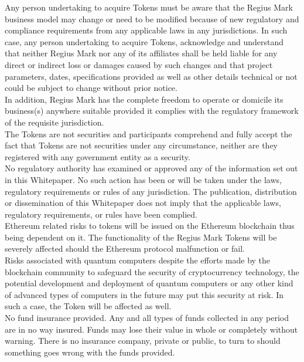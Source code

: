 \documentclass[12pt,a4paper]{article}
\begin{document}
  Any person undertaking to acquire Tokens must be aware that the Regius Mark
  business model may change or need to be modified because of new regulatory and
  compliance requirements from any applicable laws in any jurisdictions. In such
  case, any person undertaking to acquire Tokens, acknowledge and understand
  that neither Regius Mark nor any of its affiliates shall be held liable for
  any direct or indirect loss or damages caused by such changes and that project
  parameters, dates, specifications provided as well as other details technical
  or not could be subject to change without prior notice.\\

  In addition, Regius Mark has the complete freedom to operate or domicile its
  business(s) anywhere suitable provided it complies with the regulatory
  framework of the requisite jurisdiction.\\

  The Tokens are not securities and participants comprehend and fully accept the
  fact that Tokens are not securities under any circumstance, neither are they
  registered with any government entity as a security.\\

  No regulatory authority has examined or approved any of the information set
  out in this Whitepaper. No such action has been or will be taken under the
  laws, regulatory requirements or rules of any jurisdiction. The publication,
  distribution or dissemination of this Whitepaper does not imply that the
  applicable laws, regulatory requirements, or rules have been complied.\\

  Ethereum related risks to tokens will be issued on the Ethereum blockchain
  thus being dependent on it. The functionality of the Regius Mark Tokens will
  be severely affected should the Ethereum protocol malfunction or fail.\\

  Risks associated with quantum computers despite the efforts made by the
  blockchain community to safeguard the security of cryptocurrency technology,
  the potential development and deployment of quantum computers or any other
  kind of advanced types of computers in the future may put this security at
  risk. In such a case, the Token will be affected as well.\\

  No fund insurance provided. Any and all types of funds collected in any period
  are in no way insured. Funds may lose their value in whole or completely
  without warning. There is no insurance company, private or public, to turn to
  should something goes wrong with the funds provided.
\end{document}
